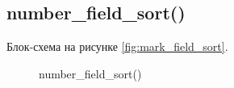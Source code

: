 \subsection{number\_field\_sort()}

Блок-схема на рисунке \ref{fig:mark_field_sort}.

\begin{figure}[p]
    \caption{number\_field\_sort()}
    \label{fig:number_field_sort}
\end{figure}





\newpage